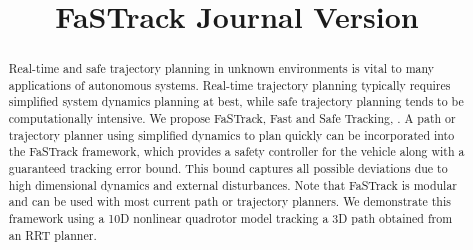 \documentclass[journal]{IEEEtran}
\title{\LARGE \bf FaSTrack Journal Version}
\author{}
\begin{document}
\maketitle
\thispagestyle{empty}
\pagestyle{empty}

\begin{abstract}
Real-time and safe trajectory planning in unknown environments is vital to many applications of autonomous systems. Real-time trajectory planning typically requires simplified system dynamics planning at best, while safe trajectory planning tends to be computationally intensive. We propose FaSTrack, Fast and Safe Tracking, . A path or trajectory planner using simplified dynamics to plan quickly can be incorporated into the FaSTrack framework, which provides a safety controller for the vehicle along with a guaranteed tracking error bound. This bound captures all possible deviations due to high dimensional dynamics and external disturbances. Note that FaSTrack is modular and can be used with most current path or trajectory planners. We demonstrate this framework using a 10D nonlinear quadrotor model tracking a 3D path obtained from an RRT planner.
\end{abstract}
























\end{document}
